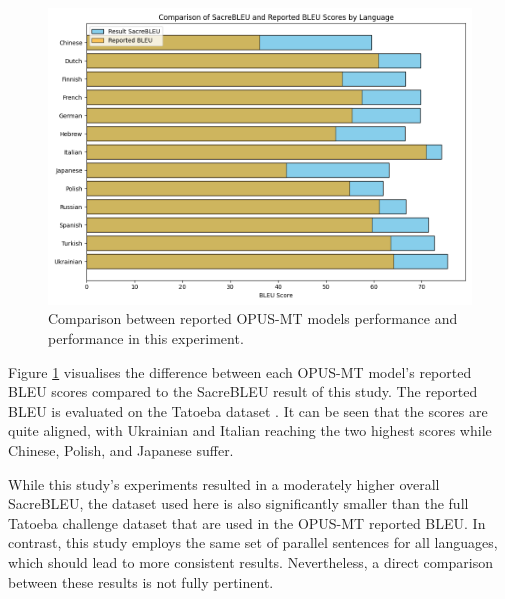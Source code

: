 \documentclass[a4paper, 11pt]{article}
\begin{document}
\begin{figure}[htbp]
    \centering
    \includegraphics[width=0.8\linewidth]{figures/opus_bleu_comparison.png}
    \caption{Comparison between reported OPUS-MT models performance and performance in this experiment.}
    \label{fig:opus_comparison}
\end{figure}

Figure \ref{fig:opus_comparison} visualises the difference between each OPUS-MT model's reported BLEU scores compared to the SacreBLEU result of this study. The reported BLEU is evaluated on the Tatoeba dataset \cite{tiedemann-2020-opus-mt}. It can be seen that the scores are quite aligned, with Ukrainian and Italian reaching the two highest scores while Chinese, Polish, and Japanese suffer.

While this study's experiments resulted in a moderately higher overall SacreBLEU, the dataset used here is also significantly smaller than the full Tatoeba challenge dataset \cite{tiedemann-2020-tatoeba-challenge} that are used in the OPUS-MT reported BLEU. In contrast, this study employs the same set of parallel sentences for all languages, which should lead to more consistent results. Nevertheless, a direct comparison between these results is not fully pertinent.
\end{document}
